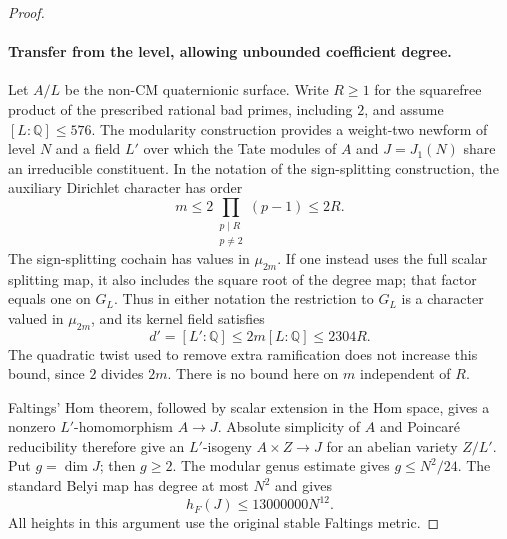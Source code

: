 \begin{proof}
\paragraph{Transfer from the level, allowing unbounded coefficient degree.}
Let $A/L$ be the non-CM quaternionic surface. Write $R\geq1$ for the
squarefree product of the prescribed rational bad primes, including $2$,
and assume $[L:\mathbb Q]\leq576$. The modularity construction provides
a weight-two newform of level $N$ and a field $L'$ over which the Tate
modules of $A$ and $J=J_1(N)$ share an irreducible constituent. In the
notation of the sign-splitting construction, the auxiliary Dirichlet
character has order
\[
 m\leq 2\prod_{\substack{p\mid R\\p\ne2}}(p-1)\leq2R.
\]
The sign-splitting cochain has values in $\mu_{2m}$. If one instead
uses the full scalar splitting map, it also includes the square root
of the degree map; that factor equals one on $G_L$. Thus in either
notation the restriction to $G_L$ is a character valued in
$\mu_{2m}$, and its kernel field satisfies
\[
 d'=[L':\mathbb Q]\leq2m[L:\mathbb Q]\leq2304R.
\tag{LT1}
\]
The quadratic twist used to remove extra ramification does not increase
this bound, since $2$ divides $2m$. There is no bound here on $m$
independent of $R$.

Faltings' Hom theorem, followed by scalar extension in the Hom space,
gives a nonzero $L'$-homomorphism $A\to J$. Absolute simplicity of $A$
and Poincar\'e reducibility therefore give an $L'$-isogeny
$A\times Z\to J$ for an abelian variety $Z/L'$. Put $g=\dim J$;
then $g\geq2$. The modular genus estimate
\cite[(5.9), p.~13]{vonKaenel2021} gives $g\leq N^2/24$.
The standard Belyi map has degree at most $N^2$ and
\cite[Theorem~1.1.1 and \S2.3]{javanpeykar} gives
\[
 h_F(J)\leq13000000N^{12}.
\tag{LT2}
\]
All heights in this argument use the original stable Faltings metric.


\end{proof}
